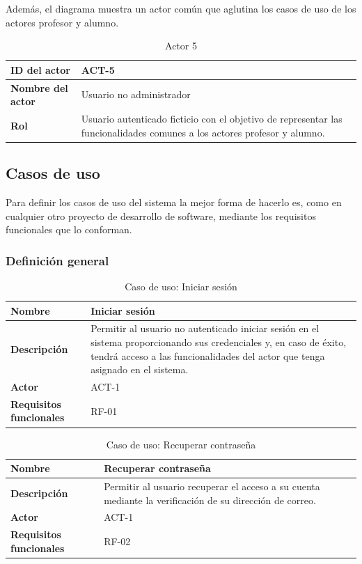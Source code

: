 Además, el diagrama muestra un actor común que aglutina los casos de uso de los actores profesor y alumno.
\begin{table}[h!]
\centering
\begin{tabularx}{\textwidth}{
  |>{\centering\arraybackslash}l
  |>{\centering\arraybackslash}X|
}
\hline
\textbf{ID del actor} & \textbf{ACT-5} \\ \hline
\textbf{Nombre del actor} & Usuario no administrador \\ \hline
\textbf{Rol} & Usuario autenticado ficticio con el objetivo de representar las funcionalidades comunes a los actores profesor y alumno. \\ \hline
\end{tabularx}
\caption{Actor 5}
\end{table}

\subsection {Casos de uso}
Para definir los casos de uso del sistema la mejor forma de hacerlo es, como en cualquier otro proyecto de desarrollo de software, mediante los requisitos funcionales que lo conforman.
\subsubsection {Definición general}
\begin{table}[H]
\centering
\begin{tabularx}{\textwidth}{
  |>{\centering\arraybackslash}l
  |>{\centering\arraybackslash}X|}
\hline
\textbf{Nombre} & {\textbf{Iniciar sesión}} \\ \hline

\textbf{Descripción} & Permitir al usuario no autenticado iniciar sesión en el sistema proporcionando sus credenciales y, en caso de éxito, tendrá acceso a las funcionalidades del actor que tenga asignado en el sistema. \\ \hline
\textbf{Actor} & ACT-1 \\ \hline
\textbf{Requisitos funcionales} & RF-01 \\ \hline
\end{tabularx}
\caption{Caso de uso: Iniciar sesión}
\end{table}
\begin{table}[H]
\centering
\begin{tabularx}{\textwidth}{
  |>{\centering\arraybackslash}l
  |>{\centering\arraybackslash}X|}
\hline
\textbf{Nombre} & {\textbf{Recuperar contraseña}} \\ \hline

\textbf{Descripción} & Permitir al usuario recuperar el acceso a su cuenta mediante la verificación de su dirección de correo. \\ \hline
\textbf{Actor} & ACT-1 \\ \hline
\textbf{Requisitos funcionales} & RF-02 \\ \hline
\end{tabularx}
\caption{Caso de uso: Recuperar contraseña}
\end{table}

